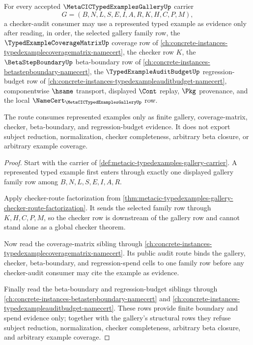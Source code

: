 \begin{theorem}
\label{thm:metacic-typedexamples-gallery-checker-audit-route}
For every accepted $\MetaCICTypedExamplesGalleryUp$ carrier
$$
G=(B,N,L,S,E,I,A,R,K,H,C,P,M),
$$
a checker-audit consumer may use a represented typed example as evidence only after reading, in order, the selected gallery family row, the $\TypedExampleCoverageMatrixUp$ coverage row of \autoref{ch:concrete-instances-typedexamplecoveragematrix-namecert}, the checker row $K$, the $\BetaStepBoundaryUp$ beta-boundary row of \autoref{ch:concrete-instances-betastepboundary-namecert}, the $\TypedExampleAuditBudgetUp$ regression-budget row of \autoref{ch:concrete-instances-typedexampleauditbudget-namecert}, componentwise $\hsame$ transport, displayed $\Cont$ replay, $\Pkg$ provenance, and the local $\NameCert_{\MetaCICTypedExamplesGalleryUp}$ row.

The route consumes represented examples only as finite gallery, coverage-matrix, checker, beta-boundary, and regression-budget evidence. It does not export subject reduction, normalization, checker completeness, arbitrary beta closure, or arbitrary example coverage.
\end{theorem}
\begin{proof}
Start with the carrier of \autoref{def:metacic-typedexamples-gallery-carrier}. A represented typed example first enters through exactly one displayed gallery family row among $B,N,L,S,E,I,A,R$.

Apply checker-route factorization from \autoref{thm:metacic-typedexamples-gallery-checker-route-factorization}. It sends the selected family row through $K,H,C,P,M$, so the checker row is downstream of the gallery row and cannot stand alone as a global checker theorem.

Now read the coverage-matrix sibling through \autoref{ch:concrete-instances-typedexamplecoveragematrix-namecert}. Its public audit route binds the gallery, checker, beta-boundary, and regression-spend cells to one family row before any checker-audit consumer may cite the example as evidence.

Finally read the beta-boundary and regression-budget siblings through \autoref{ch:concrete-instances-betastepboundary-namecert} and \autoref{ch:concrete-instances-typedexampleauditbudget-namecert}. These rows provide finite boundary and spend evidence only; together with the gallery's structural rows they refuse subject reduction, normalization, checker completeness, arbitrary beta closure, and arbitrary example coverage.
\end{proof}

